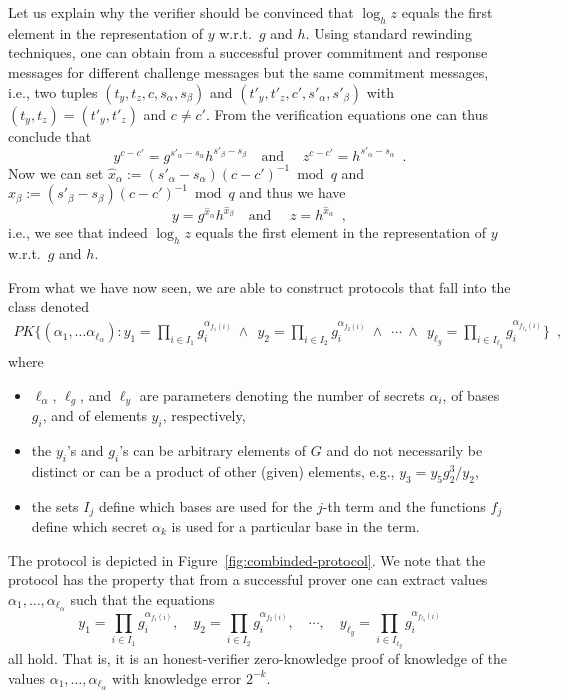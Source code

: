 Let us explain why the verifier should be convinced 
that $\log_h z$ equals the first element in the representation 
of $y$ w.r.t.\  $g$ and $h$.
Using standard rewinding techniques, one can obtain from 
a successful prover commitment and response messages 
for different challenge messages but the same commitment messages,
i.e., two tuples $(t_y,t_z,c,s_\alpha,s_\beta)$
and $(t'_y,t'_z,c',s'_\alpha,s'_\beta)$ with
$(t_y,t_z) = (t'_y,t'_z)$ and $c\neq c'$.
From the verification equations one can thus conclude that
\[
 y^{c-c'} =  g^{s'_\alpha-s_\alpha} h^{s'_\beta- s_\beta } 
\quad \text{and }\quad
 z^{c-c'} =  h^{s'_\alpha-s_\alpha}\enspace.
\]
Now we can set $\hat{x}_\alpha := (s'_\alpha-s_\alpha) (c-c')^{-1} \bmod{q}$
and $\hat{x}_\beta := (s'_\beta-s_\beta) (c-c')^{-1} \bmod{q}$
and thus we have
\[
 y =  g^{\hat{x}_\alpha} h^{\hat{x}_\beta } 
\quad \text{and }\quad
 z =  h^{\hat{x}_\alpha}\enspace,
\]
i.e., we see that indeed $\log_h z$ equals the first element in the representation 
of $y$ w.r.t.\  $g$ and $h$.

From what we have now seen, we are able to construct protocols
that fall into the class denoted
\begin{multline*}
\mathit{PK}\{(\alpha_1, \ldots \alpha_{\ell_\alpha}):
y_1 = \prod_{i \in I_1 } g_i^{\alpha_{f_1(i)}}
\ \wedge\ \
y_2 = \prod_{i \in I_2 } g_i^{\alpha_{f_2(i)}}
\ \wedge\ \ 
\cdots
\ \wedge\ \
y_{\ell_y} = \prod_{i \in I_{\ell_y} } g_i^{\alpha_{f_{\ell_y}(i)}}
\}\enspace,
\end{multline*}
where 
\begin{itemize}
\item $\ell_\alpha$, $\ell_g$, and  $\ell_y$ are parameters denoting 
the number of secrets $\alpha_i$, of bases $g_i$, and of elements $y_i$, respectively,
\item the $y_i$'s and $g_i$'s can be arbitrary elements of $G$ and do not necessarily be
distinct or can be a product of other (given) elements, e.g., $y_3 = y_5 g_2^3 / y_2$, 
\item the sets $I_j$ define which bases are used for the $j$-th
term and the functions $f_j$ define which secret $\alpha_k$ is used
for a particular base in the term.
\end{itemize}
The protocol is depicted in Figure~\ref{fig:combinded-protocol}.
We note that the protocol has the property that from a successful prover
one can extract values $\alpha_1, \ldots, \alpha_{\ell_\alpha}$
such that the equations
\[
y_1 = \prod_{i \in I_1 } g_i^{\alpha_{f_1(i)}}, \quad
y_2 = \prod_{i \in I_2 } g_i^{\alpha_{f_2(i)}}, \quad
\cdots, \quad 
y_{\ell_y} = \prod_{i \in I_{\ell_y} } g_i^{\alpha_{f_{\ell_y}(i)}}
\]
all hold.
That is, it is an honest-verifier zero-knowledge proof of knowledge of the values $\alpha_1, \ldots, \alpha_{\ell_\alpha}$
with knowledge error $2^{-k}$.


